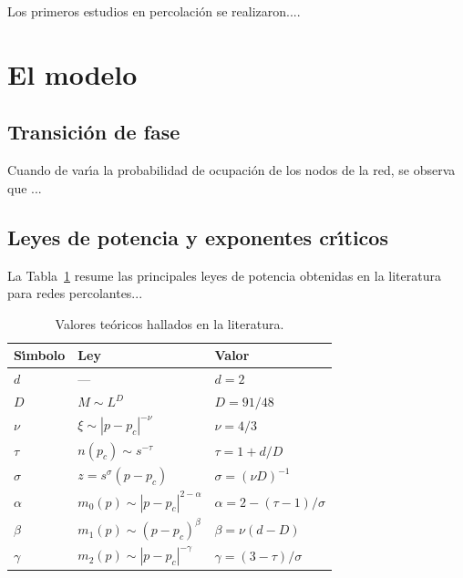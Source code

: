 \documentclass[%
 reprint,
 amsmath,amssymb,
 aps,
spanish]{revtex4-1}
\begin{document}
Los primeros estudios en percolaci\'on se realizaron....


\section{\label{theory}El modelo}



\subsection{\label{transition}Transici\'on de fase}

Cuando de var\'\i a la probabilidad de ocupaci\'on de los nodos de la red, se observa que ...

\subsection{\label{critical}Leyes de potencia y exponentes cr\'\i ticos}

La Tabla~\ref{table_1} resume las principales leyes de potencia obtenidas en la literatura para redes percolantes...

\begin{table}[h]
\caption{\label{table_1}%
Valores te\'oricos hallados en la literatura.
}
\begin{ruledtabular}
\begin{tabular}{lll}
\\[-5pt]
 S\'\i mbolo     & Ley                        & Valor                          \\
\hline
$d$             &   ---                         & $d=2$                        \\
$D$             & $M\sim L^{D}$                 & $D=91/48$                    \\
$\nu$           & $\xi\sim|p-p_c|^{-\nu}$       & $\nu=4/3$                    \\
$\tau$          & $n(p_c)\sim s^{-\tau}$        & $\tau=1+d/D$                 \\
$\sigma$        & $z=s^\sigma(p-p_c)$           & $\sigma=(\nu D)^{-1}$        \\
$\alpha$        & $m_0(p)\sim|p-p_c|^{2-\alpha}$& $\alpha=2-(\tau-1)/\sigma$   \\
$\beta$         & $m_1(p)\sim(p-p_c)^\beta$     & $\beta=\nu(d-D)$             \\
$\gamma$        & $m_2(p)\sim|p-p_c|^{-\gamma}$ & $\gamma=(3-\tau)/\sigma$     \\
\end{tabular}
\end{ruledtabular}
\end{table}
\end{document}
